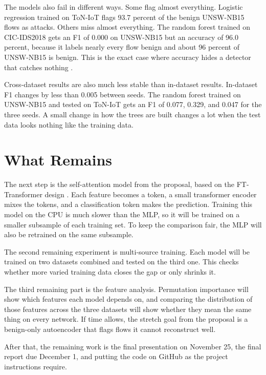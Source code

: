 \documentclass[10pt,twocolumn,letterpaper]{article}
\begin{document}
The models also fail in different ways. Some flag almost everything. Logistic regression trained on ToN-IoT flags 93.7 percent of the benign UNSW-NB15 flows as attacks. Others miss almost everything. The random forest trained on CIC-IDS2018 gets an F1 of 0.000 on UNSW-NB15 but an accuracy of 96.0 percent, because it labels nearly every flow benign and about 96 percent of UNSW-NB15 is benign. This is the exact case where accuracy hides a detector that catches nothing \cite{arp2022}.

Cross-dataset results are also much less stable than in-dataset results. In-dataset F1 changes by less than 0.005 between seeds. The random forest trained on UNSW-NB15 and tested on ToN-IoT gets an F1 of 0.077, 0.329, and 0.047 for the three seeds. A small change in how the trees are built changes a lot when the test data looks nothing like the training data.

\section{What Remains}

The next step is the self-attention model from the proposal, based on the FT-Transformer design \cite{gorishniy2021}. Each feature becomes a token, a small transformer encoder mixes the tokens, and a classification token makes the prediction. Training this model on the CPU is much slower than the MLP, so it will be trained on a smaller subsample of each training set. To keep the comparison fair, the MLP will also be retrained on the same subsample.

The second remaining experiment is multi-source training. Each model will be trained on two datasets combined and tested on the third one. This checks whether more varied training data closes the gap or only shrinks it.

The third remaining part is the feature analysis. Permutation importance will show which features each model depends on, and comparing the distribution of those features across the three datasets will show whether they mean the same thing on every network. If time allows, the stretch goal from the proposal is a benign-only autoencoder that flags flows it cannot reconstruct well.

After that, the remaining work is the final presentation on November 25, the final report due December 1, and putting the code on GitHub as the project instructions require.

{
\small


}
\end{document}
